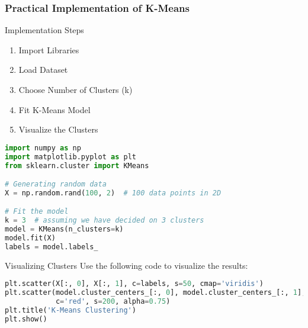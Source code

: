 \documentclass[aspectratio=169]{beamer}
\begin{document}
\begin{frame}[fragile]
    \frametitle{Practical Implementation of K-Means}
    \begin{block}{Implementation Steps}
        \begin{enumerate}
            \item Import Libraries
            \item Load Dataset
            \item Choose Number of Clusters (k)
            \item Fit K-Means Model
            \item Visualize the Clusters
        \end{enumerate}
    \end{block}

    \begin{lstlisting}[language=Python]
import numpy as np
import matplotlib.pyplot as plt
from sklearn.cluster import KMeans

# Generating random data
X = np.random.rand(100, 2)  # 100 data points in 2D

# Fit the model
k = 3  # assuming we have decided on 3 clusters
model = KMeans(n_clusters=k)
model.fit(X)
labels = model.labels_
    \end{lstlisting}

    \vfill
    \begin{block}{Visualizing Clusters}
        Use the following code to visualize the results:
    \end{block}
    \begin{lstlisting}[language=Python]
plt.scatter(X[:, 0], X[:, 1], c=labels, s=50, cmap='viridis')
plt.scatter(model.cluster_centers_[:, 0], model.cluster_centers_[:, 1], 
            c='red', s=200, alpha=0.75)
plt.title('K-Means Clustering')
plt.show()
    \end{lstlisting}
\end{frame}
\end{document}
